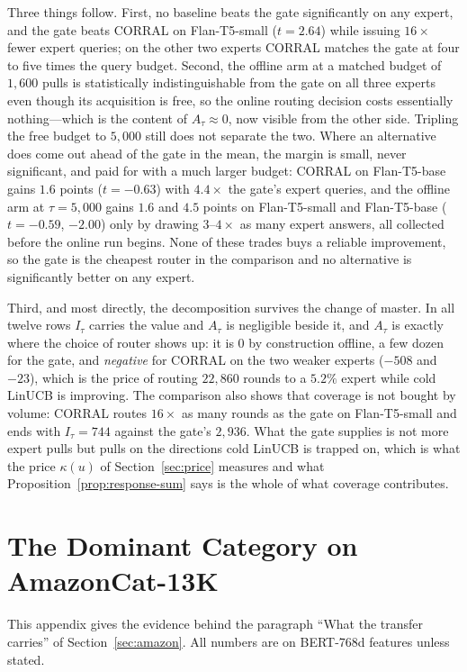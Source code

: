 \documentclass{article}
\theoremstyle{definition}
\theoremstyle{remark}
\theoremstyle{remark}
\begin{document}
Three things follow. First, no baseline beats the gate significantly on any
expert, and the gate beats CORRAL on Flan-T5-small ($t=2.64$) while issuing
$16\times$ fewer expert queries; on the other two experts CORRAL matches the
gate at four to five times the query budget. Second, the offline arm at a
matched budget of $1{,}600$ pulls is statistically indistinguishable from the
gate on all three experts even though its acquisition is free, so the online
routing decision costs essentially nothing---which is the content of
$A_\tau\approx0$, now visible from the other side. Tripling the free budget to
$5{,}000$ still does not separate the two. Where an alternative does come out
ahead of the gate in the mean, the margin is small, never significant, and
paid for with a much larger budget: CORRAL on Flan-T5-base gains $1.6$
points ($t=-0.63$) with $4.4\times$ the gate's expert queries, and the
offline arm at $\tau=5{,}000$ gains $1.6$ and $4.5$ points on Flan-T5-small
and Flan-T5-base ($t=-0.59$, $-2.00$) only by drawing $3$--$4\times$ as many
expert answers, all collected before the online run begins. None of these
trades buys a reliable improvement, so the gate is the cheapest router in
the comparison and no alternative is significantly better on any expert.

Third, and most directly, the decomposition survives the change of master. In
all twelve rows $I_\tau$ carries the value and $A_\tau$ is negligible beside
it, and $A_\tau$ is exactly where the choice of router shows up: it is $0$ by
construction offline, a few dozen for the gate, and \emph{negative} for CORRAL
on the two weaker experts ($-508$ and $-23$), which is the price of routing
$22{,}860$ rounds to a $5.2\%$ expert while cold LinUCB is improving. The
comparison also shows that coverage is not bought by volume: CORRAL routes
$16\times$ as many rounds as the gate on Flan-T5-small and ends with
$I_\tau=744$ against the gate's $2{,}936$. What the gate supplies is not more
expert pulls but pulls on the directions cold LinUCB is trapped on, which is
what the price $\kappa(u)$ of Section~\ref{sec:price} measures and what
Proposition~\ref{prop:response-sum} says is the whole of what coverage contributes.

\section{The Dominant Category on AmazonCat-13K}
\label{app:dominant}

This appendix gives the evidence behind the paragraph ``What the transfer
carries'' of Section~\ref{sec:amazon}. All numbers are on BERT-768d features
unless stated.
\end{document}
